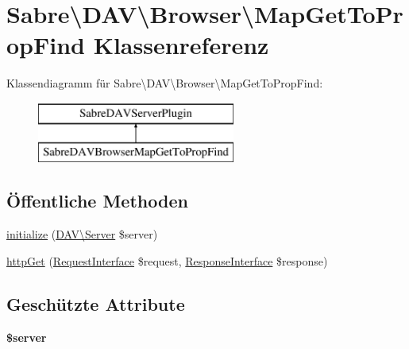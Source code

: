 \hypertarget{class_sabre_1_1_d_a_v_1_1_browser_1_1_map_get_to_prop_find}{}\section{Sabre\textbackslash{}D\+AV\textbackslash{}Browser\textbackslash{}Map\+Get\+To\+Prop\+Find Klassenreferenz}
\label{class_sabre_1_1_d_a_v_1_1_browser_1_1_map_get_to_prop_find}
Klassendiagramm für Sabre\textbackslash{}D\+AV\textbackslash{}Browser\textbackslash{}Map\+Get\+To\+Prop\+Find\+:\begin{figure}[H]
\begin{center}
\leavevmode
\includegraphics[height=2.000000cm]{class_sabre_1_1_d_a_v_1_1_browser_1_1_map_get_to_prop_find}
\end{center}
\end{figure}
\subsection*{Öffentliche Methoden}
\begin{DoxyCompactItemize}
\item 
\mbox{\hyperlink{class_sabre_1_1_d_a_v_1_1_browser_1_1_map_get_to_prop_find_a670227e1e22db49ee63f9a681b1fcf8f}{initialize}} (\mbox{\hyperlink{class_sabre_1_1_d_a_v_1_1_server}{D\+A\+V\textbackslash{}\+Server}} \$server)
\item 
\mbox{\hyperlink{class_sabre_1_1_d_a_v_1_1_browser_1_1_map_get_to_prop_find_a3d55cafd618f975cb9c00bf4b93d6801}{http\+Get}} (\mbox{\hyperlink{interface_sabre_1_1_h_t_t_p_1_1_request_interface}{Request\+Interface}} \$request, \mbox{\hyperlink{interface_sabre_1_1_h_t_t_p_1_1_response_interface}{Response\+Interface}} \$response)
\end{DoxyCompactItemize}
\subsection*{Geschützte Attribute}
\begin{DoxyCompactItemize}
\item 
\mbox{\label{class_sabre_1_1_d_a_v_1_1_browser_1_1_map_get_to_prop_find_a580dbb7012562000163cbc01246a13a9}} 
{\bfseries \$server}
\end{DoxyCompactItemize}


